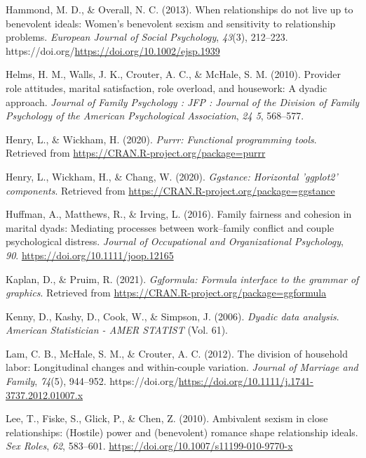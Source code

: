 \documentclass[
  man]{apa6}
\newlength{\cslhangindent}
\newlength{\cslentryspacingunit} %
\newenvironment{CSLReferences}[2] %
 {%
  \setlength{\parindent}{0pt}
  \ifodd #1
  \let\oldpar\par
  \def\par{\hangindent=\cslhangindent\oldpar}
  \fi
  \setlength{\parskip}{#2\cslentryspacingunit}
 }%
 {}
\begin{document}
\begin{CSLReferences}{1}{0}
\leavevmode{}%
Hammond, M. D., \& Overall, N. C. (2013). When relationships do not live up to benevolent ideals: Women's benevolent sexism and sensitivity to relationship problems. \emph{European Journal of Social Psychology}, \emph{43}(3), 212--223. https://doi.org/\url{https://doi.org/10.1002/ejsp.1939}

\leavevmode{}%
Helms, H. M., Walls, J. K., Crouter, A. C., \& McHale, S. M. (2010). Provider role attitudes, marital satisfaction, role overload, and housework: A dyadic approach. \emph{Journal of Family Psychology : JFP : Journal of the Division of Family Psychology of the American Psychological Association}, \emph{24 5}, 568--577.

\leavevmode{}%
Henry, L., \& Wickham, H. (2020). \emph{Purrr: Functional programming tools}. Retrieved from \url{https://CRAN.R-project.org/package=purrr}

\leavevmode{}%
Henry, L., Wickham, H., \& Chang, W. (2020). \emph{Ggstance: Horizontal 'ggplot2' components}. Retrieved from \url{https://CRAN.R-project.org/package=ggstance}

\leavevmode{}%
Huffman, A., Matthews, R., \& Irving, L. (2016). Family fairness and cohesion in marital dyads: Mediating processes between work--family conflict and couple psychological distress. \emph{Journal of Occupational and Organizational Psychology}, \emph{90}. \url{https://doi.org/10.1111/joop.12165}

\leavevmode{}%
Kaplan, D., \& Pruim, R. (2021). \emph{Ggformula: Formula interface to the grammar of graphics}. Retrieved from \url{https://CRAN.R-project.org/package=ggformula}

\leavevmode{}%
Kenny, D., Kashy, D., Cook, W., \& Simpson, J. (2006). \emph{Dyadic data analysis}. \emph{American Statistician - AMER STATIST} (Vol. 61).

\leavevmode{}%
Lam, C. B., McHale, S. M., \& Crouter, A. C. (2012). The division of household labor: Longitudinal changes and within-couple variation. \emph{Journal of Marriage and Family}, \emph{74}(5), 944--952. https://doi.org/\url{https://doi.org/10.1111/j.1741-3737.2012.01007.x}

\leavevmode{}%
Lee, T., Fiske, S., Glick, P., \& Chen, Z. (2010). Ambivalent sexism in close relationships: (Hostile) power and (benevolent) romance shape relationship ideals. \emph{Sex Roles}, \emph{62}, 583--601. \url{https://doi.org/10.1007/s11199-010-9770-x}


\end{CSLReferences}
\end{document}
